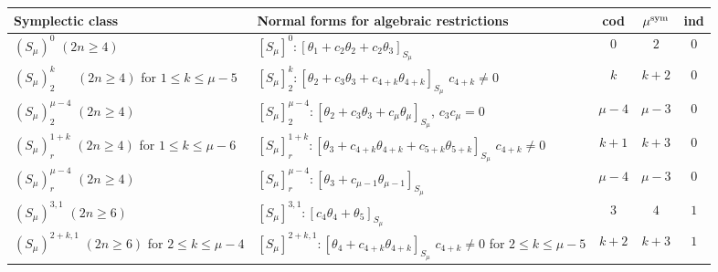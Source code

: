 \documentclass{amsart}
\theoremstyle{definition}
\numberwithin{equation}{section}
\begin{document}
\begin{center}
\begin{table}[!h]

    \begin{small}
    \noindent
    \begin{tabular}{|p{2.9cm}|p{5.7cm}|c|c|c|}
          
            \hline
    Symplectic class &   Normal forms for
                algebraic restrictions    & cod & $\mu ^{\rm sym}$ &  ind  \\ \hline
  $(S_{\mu})^{0}$ \;\;\;\; \; $(2n\ge 4)$ & $[S_{\mu}]^0: [\theta _1 + c_2\theta _2 + c_2\theta_3]_{S_{\mu}}$  &  $0$ & $2$ & $0$  \\  \hline

  $(S_{\mu})^{k}_2 \;\;\;\;\;\; (2n\ge 4)$ \newline for $1\leq k\leq \mu-\!5$ & $[S_{\mu}]^{k}_2: [\theta _2 + c_3\theta _3 + c_{4+k}\theta _{4+k}]_{S_{\mu}}$
  \newline 
  $c_{4+k}\!\ne\! 0$        &  $k$ & $k+2$ & $0$ \\ \hline

   $(S_{\mu})^{\mu-4}_2$ \; $(2n\ge 4)$& $[S_{\mu}]^{\mu-4}_2: [\theta _2 + c_3\theta_3+c_{\mu}\theta_{\mu}]_{S_{\mu}}$, \; $c_3c_{\mu}=0$
              & $\mu-4$ & $\mu-3$ & $0$     \\ \hline

   $(S_{\mu})^{1+k}_r$ \; $(2n\ge 4)$ \newline for  $1\leq k\leq \mu-\!6$ & $[S_{\mu}]^{1+k}_r: [\theta _3\!+c_{4+k}\theta _{4+k}\!+c_{5+k} \theta _{5+k}]_{S_{\mu}}$ \newline $c_{4+k}\!\ne\! 0$
                                         &  $k+1$ & $k+3$ & $0$ \\ \hline

    $(S_{\mu})^{\mu-4}_r$ \;\; $(2n\ge 4)$ & $[S_{\mu}]^{\mu-4}_r: [\theta _3 + c_{\mu-1}\theta _{\mu-1}]_{S_{\mu}}$ & $\mu-4$ & $\mu-3$ & $0$  \\ \hline

    $(S_{\mu})^{3,1}$ \;\;\; $(2n\ge 6)$ & $[S_{\mu}]^{3,1}: [c_4\theta _4 + \theta _5]_{S_{\mu}}$
     &  $3$ & $4 $ & $1$    \\ \hline

    $(S_{\mu})^{2+k,1}$ \; $(2n\ge 6)$ \newline for  $2\leq k\leq \mu -4$ & $[S_{\mu}]^{2+k,1}: [\theta _4 + c_{4+k}\theta _{4+k}]_{S_{\mu}}$ \newline $c_{4+k}\ne 0$ for  $2\leq k\leq \mu -5$
     &  $k+2$ & $k+3 $ & $1$    \\ \hline


\end{tabular}
\end{small}
\end{table}
\end{center}
\end{document}
